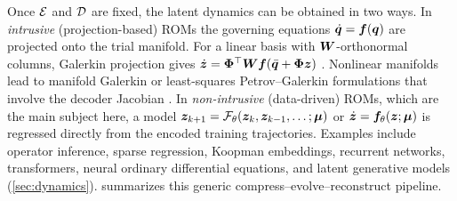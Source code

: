 Once $\mathcal{E}$ and $\mathcal{D}$ are fixed, the latent dynamics can be obtained in two
ways. In \emph{intrusive} (projection-based) ROMs the governing equations
$\dot{\bm{q}}=\bm{f}(\bm{q})$ are projected onto the trial manifold. For a linear
basis with $\bm{W}$-orthonormal columns, Galerkin projection gives
$\dot{\bm{z}}=\bm{\Phi}^{\top}\bm{W}\bm{f}(\bar{\bm{q}}+\bm{\Phi}\bm{z})$
\parencite{holmes2012turbulence,benner2015survey}. Nonlinear manifolds lead to
manifold Galerkin or least-squares Petrov--Galerkin formulations that involve
the decoder Jacobian \parencite{lee2020cae}. In \emph{non-intrusive}
(data-driven) ROMs, which are the main subject here, a model
$\bm{z}_{k+1}=\mathcal{F}_{\theta}(\bm{z}_k,\bm{z}_{k-1},\dots;\bm{\mu})$ or
$\dot{\bm{z}}=\bm{f}_{\theta}(\bm{z};\bm{\mu})$ is regressed directly from the encoded
training trajectories. Examples include operator inference, sparse regression,
Koopman embeddings, recurrent networks, transformers, neural ordinary
differential equations, and latent generative models (\cref{sec:dynamics}).
 summarizes this generic compress--evolve--reconstruct
pipeline.

